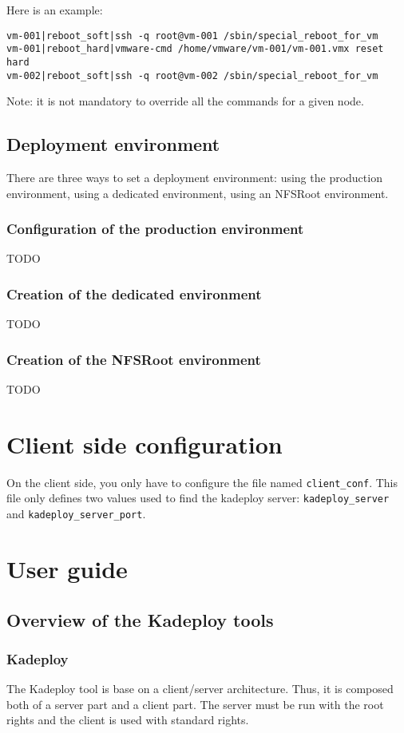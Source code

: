 \documentclass[a4wide,10pt,oneside]{book}
\begin{document}
Here is an example:
\begin{small}
\begin{verbatim}
vm-001|reboot_soft|ssh -q root@vm-001 /sbin/special_reboot_for_vm
vm-001|reboot_hard|vmware-cmd /home/vmware/vm-001/vm-001.vmx reset hard
vm-002|reboot_soft|ssh -q root@vm-002 /sbin/special_reboot_for_vm
\end{verbatim}
\end{small}
Note: it is not mandatory to override all the commands for a given node.


\section{Deployment environment}
There are three ways to set a deployment environment: using the production environment, using a dedicated environment, using an NFSRoot environment.

\subsection{Configuration of the production environment}
TODO
\subsection{Creation of the dedicated environment}
TODO
\subsection{Creation of the NFSRoot environment}
TODO
\chapter{Client side configuration}
On the client side, you only have to configure the file named \texttt{client\_conf}. This file only defines two values used to find the kadeploy server: \texttt{kadeploy\_server} and \texttt{kadeploy\_server\_port}.

\chapter{User guide}

\section{Overview of the Kadeploy tools}
\subsection{Kadeploy}
The Kadeploy tool is base on a client/server architecture. Thus, it is composed both of a server part and a client part. The server must be run with the root rights and the client is used with standard rights.
\end{document}
